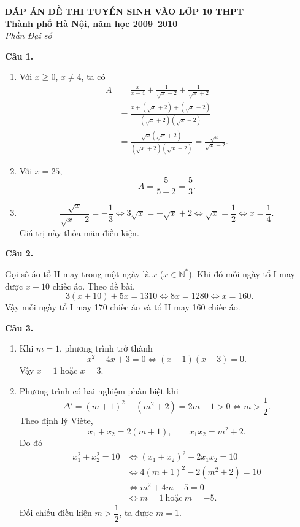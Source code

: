 \documentclass[12pt,a4paper]{article}
\begin{document}
\begin{center}
{\Large\bfseries ĐÁP ÁN ĐỀ THI TUYỂN SINH VÀO LỚP 10 THPT}\\
{\bfseries Thành phố Hà Nội, năm học 2009--2010}\\
{\itshape Phần Đại số}
\end{center}

\textbf{Câu 1.}
\begin{enumerate}[label=\alph*)]
\item Với $x\ge0$, $x\ne4$, ta có
\begin{align*}
A&=\frac{x}{x-4}+\frac{1}{\sqrt{x}-2}+\frac{1}{\sqrt{x}+2}\\
&=\frac{x+(\sqrt{x}+2)+(\sqrt{x}-2)}
{(\sqrt{x}+2)(\sqrt{x}-2)}\\
&=\frac{\sqrt{x}(\sqrt{x}+2)}
{(\sqrt{x}+2)(\sqrt{x}-2)}
=\frac{\sqrt{x}}{\sqrt{x}-2}.
\end{align*}
\item Với $x=25$,
\[
A=\frac5{5-2}=\frac53.
\]
\item
\[
\frac{\sqrt{x}}{\sqrt{x}-2}=-\frac13
\Longleftrightarrow 3\sqrt{x}=-\sqrt{x}+2
\Longleftrightarrow \sqrt{x}=\frac12
\Longleftrightarrow x=\frac14.
\]
Giá trị này thỏa mãn điều kiện.
\end{enumerate}

\textbf{Câu 2.}

Gọi số áo tổ II may trong một ngày là $x$ ($x\in\mathbb N^*$). Khi đó mỗi ngày tổ I may được $x+10$ chiếc áo. Theo đề bài,
\[
3(x+10)+5x=1310
\Longleftrightarrow 8x=1280
\Longleftrightarrow x=160.
\]
Vậy mỗi ngày tổ I may 170 chiếc áo và tổ II may 160 chiếc áo.

\textbf{Câu 3.}
\begin{enumerate}[label=\alph*)]
\item Khi $m=1$, phương trình trở thành
\[
x^2-4x+3=0
\Longleftrightarrow (x-1)(x-3)=0.
\]
Vậy $x=1$ hoặc $x=3$.

\item Phương trình có hai nghiệm phân biệt khi
\[
\Delta'=(m+1)^2-(m^2+2)=2m-1>0
\Longleftrightarrow m>\frac12.
\]
Theo định lý Viète,
\[
x_1+x_2=2(m+1),\qquad x_1x_2=m^2+2.
\]
Do đó
\begin{align*}
x_1^2+x_2^2=10
&\Longleftrightarrow (x_1+x_2)^2-2x_1x_2=10\\
&\Longleftrightarrow 4(m+1)^2-2(m^2+2)=10\\
&\Longleftrightarrow m^2+4m-5=0\\
&\Longleftrightarrow m=1\ \text{hoặc}\ m=-5.
\end{align*}
Đối chiếu điều kiện $m>\dfrac12$, ta được $\boxed{m=1}$.
\end{enumerate}
\end{document}
